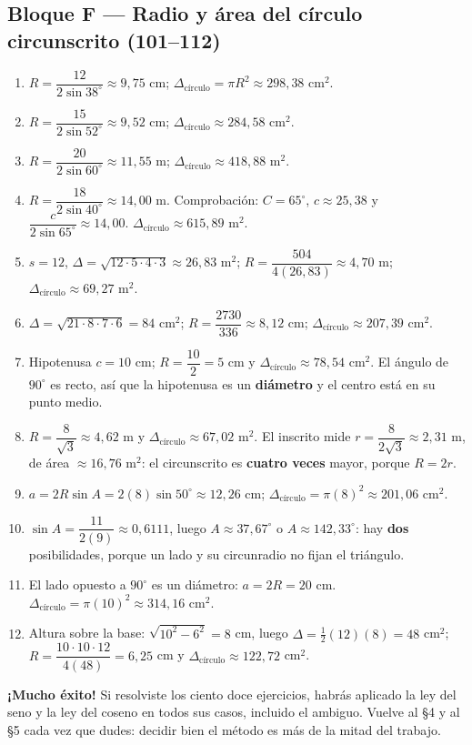 \documentclass[12pt, letterpaper]{article}
\providecommand{\sen}{\sin}
\begin{document}
\subsection*{Bloque F — Radio y área del círculo circunscrito (101--112)}
\begin{enumerate}[leftmargin=*, label=\textbf{\arabic*.}, start=101]
  \item $R=\dfrac{12}{2\sen 38^\circ}\approx 9{,}75$ cm; $\Delta_{\text{círculo}}=\pi R^2\approx 298{,}38$ cm$^2$.
  \item $R=\dfrac{15}{2\sen 52^\circ}\approx 9{,}52$ cm; $\Delta_{\text{círculo}}\approx 284{,}58$ cm$^2$.
  \item $R=\dfrac{20}{2\sen 60^\circ}\approx 11{,}55$ m; $\Delta_{\text{círculo}}\approx 418{,}88$ m$^2$.
  \item $R=\dfrac{18}{2\sen 40^\circ}\approx 14{,}00$ m. Comprobación: $C=65^\circ$, $c\approx 25{,}38$ y $\dfrac{c}{2\sen 65^\circ}\approx 14{,}00$. $\Delta_{\text{círculo}}\approx 615{,}89$ m$^2$.
  \item $s=12$, $\Delta=\sqrt{12\cdot5\cdot4\cdot3}\approx 26{,}83$ m$^2$; $R=\dfrac{504}{4(26{,}83)}\approx 4{,}70$ m; $\Delta_{\text{círculo}}\approx 69{,}27$ m$^2$.
  \item $\Delta=\sqrt{21\cdot8\cdot7\cdot6}=84$ cm$^2$; $R=\dfrac{2730}{336}\approx 8{,}12$ cm; $\Delta_{\text{círculo}}\approx 207{,}39$ cm$^2$.
  \item Hipotenusa $c=10$ cm; $R=\dfrac{10}{2}=5$ cm y $\Delta_{\text{círculo}}\approx 78{,}54$ cm$^2$. El ángulo de $90^\circ$ es recto, así que la hipotenusa es un \textbf{diámetro} y el centro está en su punto medio.
  \item $R=\dfrac{8}{\sqrt3}\approx 4{,}62$ m y $\Delta_{\text{círculo}}\approx 67{,}02$ m$^2$. El inscrito mide $r=\dfrac{8}{2\sqrt3}\approx 2{,}31$ m, de área $\approx 16{,}76$ m$^2$: el circunscrito es \textbf{cuatro veces} mayor, porque $R=2r$.
  \item $a=2R\sen A=2(8)\sen 50^\circ\approx 12{,}26$ cm; $\Delta_{\text{círculo}}=\pi(8)^2\approx 201{,}06$ cm$^2$.
  \item $\sen A=\dfrac{11}{2(9)}\approx 0{,}6111$, luego $A\approx 37{,}67^\circ$ o $A\approx 142{,}33^\circ$: hay \textbf{dos} posibilidades, porque un lado y su circunradio no fijan el triángulo.
  \item El lado opuesto a $90^\circ$ es un diámetro: $a=2R=20$ cm. $\Delta_{\text{círculo}}=\pi(10)^2\approx 314{,}16$ cm$^2$.
  \item Altura sobre la base: $\sqrt{10^2-6^2}=8$ cm, luego $\Delta=\tfrac12(12)(8)=48$ cm$^2$; $R=\dfrac{10\cdot10\cdot12}{4(48)}=6{,}25$ cm y $\Delta_{\text{círculo}}\approx 122{,}72$ cm$^2$.
\end{enumerate}

\vspace{10pt}
\begin{cuadroinfo}
  \small
  \textbf{¡Mucho éxito!} Si resolviste los ciento doce ejercicios, habrás aplicado la
  ley del seno y la ley del coseno en todos sus casos, incluido el ambiguo.
  Vuelve al §4 y al §5 cada vez que dudes: decidir bien el método es más de la
  mitad del trabajo.
\end{cuadroinfo}

\fi
\end{document}
